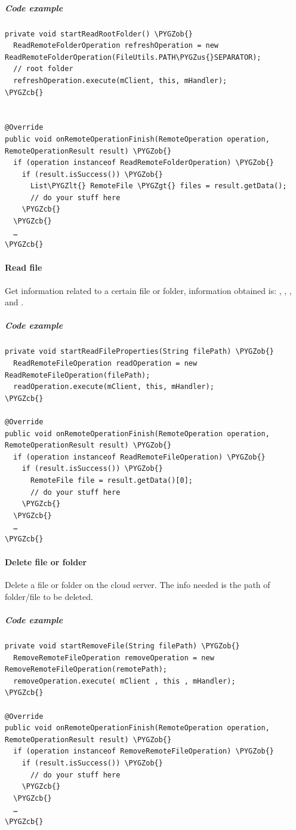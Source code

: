 \documentclass[letterpaper,10pt,english]{sphinxmanual}
\def\PYGZus{\char`\_}
\def\PYGZob{\char`\{}
\def\PYGZcb{\char`\}}
\def\PYGZlt{\char`\<}
\def\PYGZgt{\char`\>}
\begin{document}
\subparagraph{Code example}
\label{android_library/examples:id3}
\begin{Verbatim}[commandchars=\\\{\}]
private void startReadRootFolder() \PYGZob{}
  ReadRemoteFolderOperation refreshOperation = new ReadRemoteFolderOperation(FileUtils.PATH\PYGZus{}SEPARATOR);
  // root folder
  refreshOperation.execute(mClient, this, mHandler);
\PYGZcb{}


@Override
public void onRemoteOperationFinish(RemoteOperation operation, RemoteOperationResult result) \PYGZob{}
  if (operation instanceof ReadRemoteFolderOperation) \PYGZob{}
    if (result.isSuccess()) \PYGZob{}
      List\PYGZlt{} RemoteFile \PYGZgt{} files = result.getData();
      // do your stuff here
    \PYGZcb{}
  \PYGZcb{}
  …
\PYGZcb{}
\end{Verbatim}


\paragraph{Read file}
\label{android_library/examples:read-file}
Get information related to a certain file or folder, information obtained is:
, , ,  and .


\subparagraph{Code example}
\label{android_library/examples:id4}
\begin{Verbatim}[commandchars=\\\{\}]
private void startReadFileProperties(String filePath) \PYGZob{}
  ReadRemoteFileOperation readOperation = new ReadRemoteFileOperation(filePath);
  readOperation.execute(mClient, this, mHandler);
\PYGZcb{}

@Override
public void onRemoteOperationFinish(RemoteOperation operation, RemoteOperationResult result) \PYGZob{}
  if (operation instanceof ReadRemoteFileOperation) \PYGZob{}
    if (result.isSuccess()) \PYGZob{}
      RemoteFile file = result.getData()[0];
      // do your stuff here
    \PYGZcb{}
  \PYGZcb{}
  …
\PYGZcb{}
\end{Verbatim}


\paragraph{Delete file or folder}
\label{android_library/examples:delete-file-or-folder}
Delete a file or folder on the cloud server. The info needed is the path of
folder/file to be deleted.


\subparagraph{Code example}
\label{android_library/examples:id5}
\begin{Verbatim}[commandchars=\\\{\}]
private void startRemoveFile(String filePath) \PYGZob{}
  RemoveRemoteFileOperation removeOperation = new RemoveRemoteFileOperation(remotePath);
  removeOperation.execute( mClient , this , mHandler);
\PYGZcb{}

@Override
public void onRemoteOperationFinish(RemoteOperation operation, RemoteOperationResult result) \PYGZob{}
  if (operation instanceof RemoveRemoteFileOperation) \PYGZob{}
    if (result.isSuccess()) \PYGZob{}
      // do your stuff here
    \PYGZcb{}
  \PYGZcb{}
  …
\PYGZcb{}
\end{Verbatim}
\end{document}
